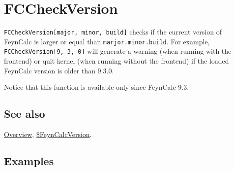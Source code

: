 \documentclass[../FeynCalcManual.tex]{subfiles}
\begin{document}
\hypertarget{fccheckversion}{
\section{FCCheckVersion}\label{fccheckversion}}

\texttt{FCCheckVersion[\allowbreak{}major,\ \allowbreak{}minor,\ \allowbreak{}build]}
checks if the current version of FeynCalc is larger or equal than
\texttt{marjor.minor.build}. For example,
\texttt{FCCheckVersion[\allowbreak{}9,\ \allowbreak{}3,\ \allowbreak{}0]}
will generate a warning (when running with the frontend) or quit kernel
(when running without the frontend) if the loaded FeynCalc version is
older than 9.3.0.

Notice that this function is available only since FeynCalc 9.3.

\subsection{See also}

\hyperlink{toc}{Overview},
\hyperlink{dollarfeyncalcversion}{\$FeynCalcVersion}.

\subsection{Examples}

\begin{Shaded}
\begin{Highlighting}[]
\OperatorTok{[}\OperatorTok{,} \OperatorTok{,} \OperatorTok{]}
\end{Highlighting}
\end{Shaded}

\begin{Shaded}
\begin{Highlighting}[]
\end{Highlighting}
\end{Shaded}
\end{document}
